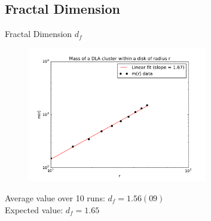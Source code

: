 \documentclass{beamer}
\begin{document}
\subsection{Fractal Dimension}

\begin{frame}{Fractal Dimension $d_f$}

\begin{figure}[H]
	\centering
	\includegraphics[width=0.7\textwidth]{mass_vs_R.pdf}
\end{figure}

Average value over 10 runs: $d_f = 1.56(09)$\\
Expected value: $d_f  = 1.65$

\end{frame}




\end{document}
